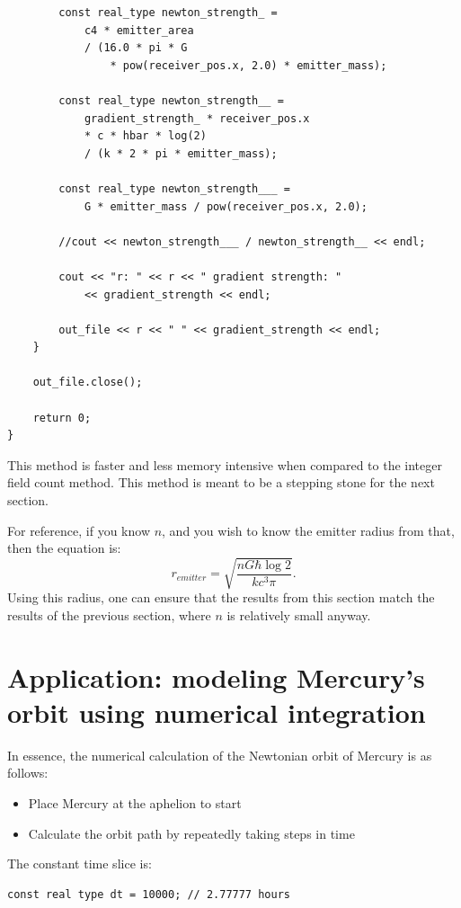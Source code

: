 \documentclass[12pt]{article}
\begin{document}
\begin{lstlisting}
		const real_type newton_strength_ =
			c4 * emitter_area
			/ (16.0 * pi * G 
				* pow(receiver_pos.x, 2.0) * emitter_mass);

		const real_type newton_strength__ =
			gradient_strength_ * receiver_pos.x 
			* c * hbar * log(2)
			/ (k * 2 * pi * emitter_mass);

		const real_type newton_strength___ =
			G * emitter_mass / pow(receiver_pos.x, 2.0);

		//cout << newton_strength___ / newton_strength__ << endl;

		cout << "r: " << r << " gradient strength: "
			<< gradient_strength << endl;

		out_file << r << " " << gradient_strength << endl;
	}

	out_file.close();

	return 0;
}
\end{lstlisting}

This method is faster and less memory intensive when compared to the integer field count method.
This method is meant to be a stepping stone for the next section.

For reference, if you know $n$, and you wish to know the emitter radius from that, then the equation is:
\begin{equation}
r_{\textit{emitter}} = \sqrt{\frac{n G \hbar \log 2}{k c^3 \pi}}.
\end{equation}
Using this radius, one can ensure that the results from this section match the results of the previous section, where $n$ is relatively small anyway.




\section{Application: modeling Mercury's orbit using numerical integration}

In essence, the numerical calculation of the Newtonian orbit of Mercury is as follows:
\begin{itemize}
\item Place Mercury at the aphelion to start
\item Calculate the orbit path by repeatedly taking steps in time
\end{itemize}

The constant time slice is:
\begin{lstlisting}
const real type dt = 10000; // 2.77777 hours
\end{lstlisting}
\end{document}
